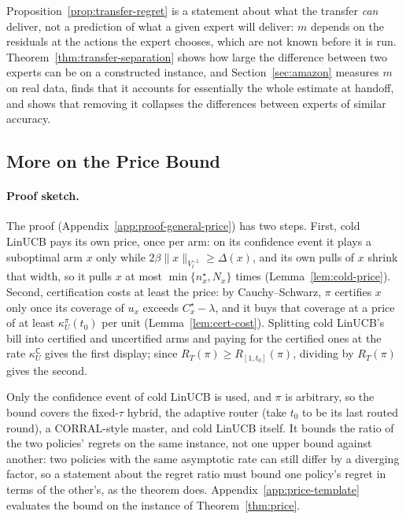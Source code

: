 \documentclass[anon]{alt2027} %
\newcommand{\Cold}{\mathsf{C}}
\begin{document}
Proposition~\ref{prop:transfer-regret} is a statement about what the transfer
\emph{can} deliver, not a prediction of what a given expert will deliver: $m$
depends on the residuals at the actions the expert chooses, which are not
known before it is run. Theorem~\ref{thm:transfer-separation} shows how large
the difference between two experts can be on a constructed instance, and
Section~\ref{sec:amazon} measures $m$ on real data, finds that it accounts for
essentially the whole estimate at handoff, and shows that removing it
collapses the differences between experts of similar accuracy.


\subsection{More on the Price Bound}
\label{app:price-more}

\paragraph{Proof sketch.}The proof (Appendix~\ref{app:proof-general-price}) has
two steps. First, cold LinUCB pays its own price, once per arm: on its
confidence event it plays a suboptimal arm $x$ only while
$2\beta\|x\|_{V_t^{-1}}\ge\Delta(x)$, and its own pulls of $x$ shrink that
width, so it pulls $x$ at most $\min\{n^\star_x,N_x\}$ times
(Lemma~\ref{lem:cold-price}). Second, certification costs at least the price:
by Cauchy--Schwarz, $\pi$ certifies $x$ only once its coverage of $u_x$
exceeds $C^\star_x-\lambda$, and it buys that coverage at a price of at least
$\kappa^\pi_U(t_0)$ per unit (Lemma~\ref{lem:cert-cost}). Splitting cold
LinUCB's bill into certified and uncertified arms and paying for the
certified ones at the rate $\kappa^{\Cold}_U$ gives the first display; since
$R_T(\pi)\ge R_{[1,t_0]}(\pi)$, dividing by $R_T(\pi)$ gives the second.

Only the confidence event of cold LinUCB is used, and
$\pi$ is arbitrary, so the bound covers the fixed-$\tau$ hybrid, the adaptive
router (take $t_0$ to be its last routed round), a CORRAL-style master, and
cold LinUCB itself. It bounds the ratio of the two policies' regrets on the
same instance, not one upper bound against another: two policies with the
same asymptotic rate can still differ by a diverging factor, so a statement
about the regret ratio must bound one policy's regret in terms of the other's,
as the theorem does. Appendix~\ref{app:price-template} evaluates the bound on the
instance of Theorem~\ref{thm:price}.
\end{document}
